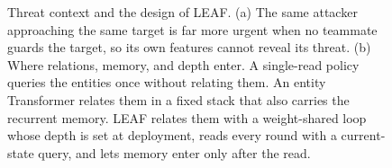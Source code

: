 \begin{figure}[!t]
\centering
{}
\caption{Threat context and the design of LEAF. (a) The same attacker approaching the same target is far more urgent when no teammate guards the target, so its own features cannot reveal its threat. (b) Where relations, memory, and depth enter. A single-read policy queries the entities once without relating them. An entity Transformer relates them in a fixed stack that also carries the recurrent memory. LEAF relates them with a weight-shared loop whose depth is set at deployment, reads every round with a current-state query, and lets memory enter only after the read.}
\label{fig:motivation}
\end{figure}

